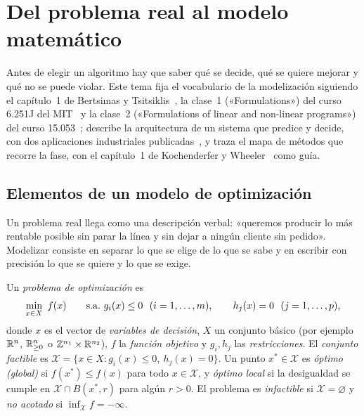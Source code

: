\chapter{Del problema real al modelo matemático}
\label{tema:1}

Antes de elegir un algoritmo hay que saber qué se decide, qué se quiere mejorar y qué no se puede violar. Este tema fija el vocabulario de la modelización siguiendo el capítulo~1 de Bertsimas y Tsitsiklis~\cite{bt}, la clase~1 («Formulations») del curso 6.251J del MIT~\cite{mit6251} y la clase~2 («Formulations of linear and non-linear programs») del curso 15.053~\cite{mit15053}; describe la arquitectura de un sistema que predice y decide, con dos aplicaciones industriales publicadas~\cite{deepmind,orion}, y traza el mapa de métodos que recorre la fase, con el capítulo~1 de Kochenderfer y Wheeler~\cite{kw} como guía.

\section{Elementos de un modelo de optimización}

Un problema real llega como una descripción verbal: «queremos producir lo más rentable posible sin parar la línea y sin dejar a ningún cliente sin pedido». Modelizar consiste en separar lo que se elige de lo que se sabe y en escribir con precisión lo que se quiere y lo que se exige.

\begin{definicion}\label{def:prob-opt}
Un \emph{problema de optimización} es
\[
\min_{x\in X}\ f(x)\qquad \st g_i(x)\le 0\ \ (i=1,\dots,m),\qquad h_j(x)=0\ \ (j=1,\dots,p),
\]
donde $x$ es el vector de \emph{variables de decisión}, $X$ un conjunto básico (por ejemplo $\mathbb{R}^{n}$, $\mathbb{R}^{n}_{\ge 0}$ o $\mathbb{Z}^{n_1}\times\mathbb{R}^{n_2}$), $f$ la \emph{función objetivo} y $g_i,h_j$ las \emph{restricciones}. El \emph{conjunto factible} es $\mathcal{X}=\{x\in X: g_i(x)\le 0,\ h_j(x)=0\}$. Un punto $x^{*}\in\mathcal{X}$ es \emph{óptimo (global)} si $f(x^{*})\le f(x)$ para todo $x\in\mathcal{X}$, y \emph{óptimo local} si la desigualdad se cumple en $\mathcal{X}\cap B(x^{*},r)$ para algún $r>0$. El problema es \emph{infactible} si $\mathcal{X}=\varnothing$ y \emph{no acotado} si $\inf_{\mathcal{X}}f=-\infty$.
\end{definicion}

